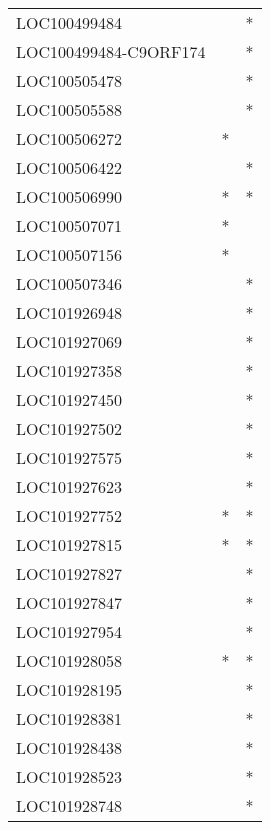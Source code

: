 \begin{longtable}{lcc}
LOC100499484          &                &          * \\
LOC100499484-C9ORF174 &                &          * \\
LOC100505478          &                &          * \\
LOC100505588          &                &          * \\
LOC100506272          &              * &            \\
LOC100506422          &                &          * \\
LOC100506990          &              * &          * \\
LOC100507071          &              * &            \\
LOC100507156          &              * &            \\
LOC100507346          &                &          * \\
LOC101926948          &                &          * \\
LOC101927069          &                &          * \\
LOC101927358          &                &          * \\
LOC101927450          &                &          * \\
LOC101927502          &                &          * \\
LOC101927575          &                &          * \\
LOC101927623          &                &          * \\
LOC101927752          &              * &          * \\
LOC101927815          &              * &          * \\
LOC101927827          &                &          * \\
LOC101927847          &                &          * \\
LOC101927954          &                &          * \\
LOC101928058          &              * &          * \\
LOC101928195          &                &          * \\
LOC101928381          &                &          * \\
LOC101928438          &                &          * \\
LOC101928523          &                &          * \\
LOC101928748          &                &          * \\

\end{longtable}
